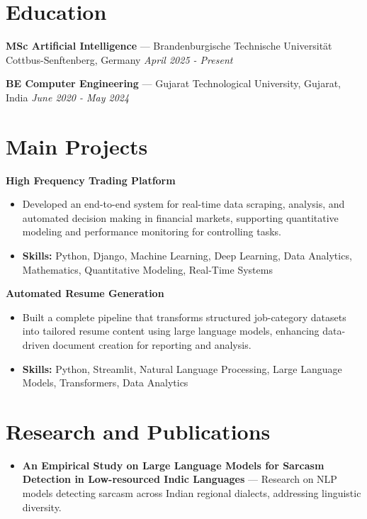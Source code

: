 \documentclass[a4paper,10pt]{article}
\begin{document}
\section*{Education}
\textbf{MSc Artificial Intelligence} — Brandenburgische Technische Universität Cottbus-Senftenberg, Germany \hfill \textit{April 2025 - Present}\par
\vspace{1.5pt}
\textbf{BE Computer Engineering} — Gujarat Technological University, Gujarat, India \hfill \textit{June 2020 - May 2024}\par

\section*{Main Projects}
\textbf{High Frequency Trading Platform}\par
\vspace{1pt}
\begin{itemize}
  \item Developed an end-to-end system for real-time data scraping, analysis, and automated decision making in financial markets, supporting quantitative modeling and performance monitoring for controlling tasks.
  \item \textbf{Skills:} Python, Django, Machine Learning, Deep Learning, Data Analytics, Mathematics, Quantitative Modeling, Real-Time Systems
\end{itemize}
\vspace{3pt}
\textbf{Automated Resume Generation}\par
\vspace{1pt}
\begin{itemize}
  \item Built a complete pipeline that transforms structured job-category datasets into tailored resume content using large language models, enhancing data-driven document creation for reporting and analysis.
  \item \textbf{Skills:} Python, Streamlit, Natural Language Processing, Large Language Models, Transformers, Data Analytics
\end{itemize}

\section*{Research and Publications}
\begin{itemize}
\item \textbf{An Empirical Study on Large Language Models for Sarcasm Detection in Low-resourced Indic Languages} — Research on NLP models detecting sarcasm across Indian regional dialects, addressing linguistic diversity.
\end{itemize}
\end{document}
